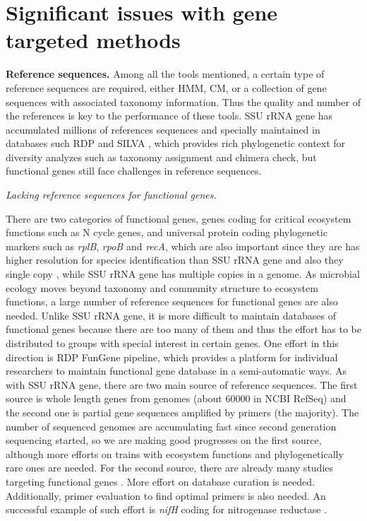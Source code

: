 \documentclass[]{msu-thesis}
\begin{document}
\section{Significant issues with gene targeted methods}

\textbf{Reference sequences. }
Among all the tools mentioned, a certain type of reference sequences are required, either HMM, CM, or a collection of gene sequences with associated taxonomy information. Thus the quality and number of the references is key to the performance of these tools. SSU rRNA gene has accumulated millions of references sequences and specially maintained in databases such RDP and SILVA \cite{cole_ribosomal_2014,quast_silva_2013}, which provides rich phylogenetic context for diversity analyzes such as taxonomy assignment and chimera check, but functional genes still face challenges in reference sequences.

\textit{Lacking reference sequences for functional genes. }

There are two categories of functional genes, genes coding for critical ecosystem functions such as N cycle genes, and universal protein coding phylogenetic markers such as \textit{rplB}, \textit{rpoB} and \textit{recA}, which are also important since they are has higher resolution for species identification than SSU rRNA gene and also they single copy \cite{case_use_2007,roux_comparison_2011}, while SSU rRNA gene has multiple copies in a genome. As microbial ecology moves beyond taxonomy and community structure to ecosystem functions, a large number of reference sequences for functional genes are also needed. Unlike SSU rRNA gene, it is more difficult to maintain databases of functional genes because there are too many of them and thus the effort has to be distributed to groups with special interest in certain genes. One effort in this direction is RDP FunGene pipeline, which provides a platform for individual researchers to maintain functional gene database in a semi-automatic ways. As with SSU rRNA gene, there are two main source of reference sequences. The first source is whole length genes from genomes (about 60000 in NCBI RefSeq) and the second one is partial gene sequences amplified by primers (the majority). The number of sequenced genomes are accumulating fast since second generation sequencing started, so we are making good progresses on the first source, although more efforts on trains with ecosystem functions and phylogenetically rare ones are needed. For the second source, there are already many studies targeting functional genes \cite{penton_functional_2013,hai_quantification_2009,treusch_novel_2005,huang_biodiversity_2011}. More effort on database curation is needed. Additionally, primer evaluation to find optimal primers is also needed. An successful example of such effort is \textit{nifH} coding for nitrogenase reductase \cite{gaby_comprehensive_2014,gaby_comprehensive_2012}. 
\end{document}
